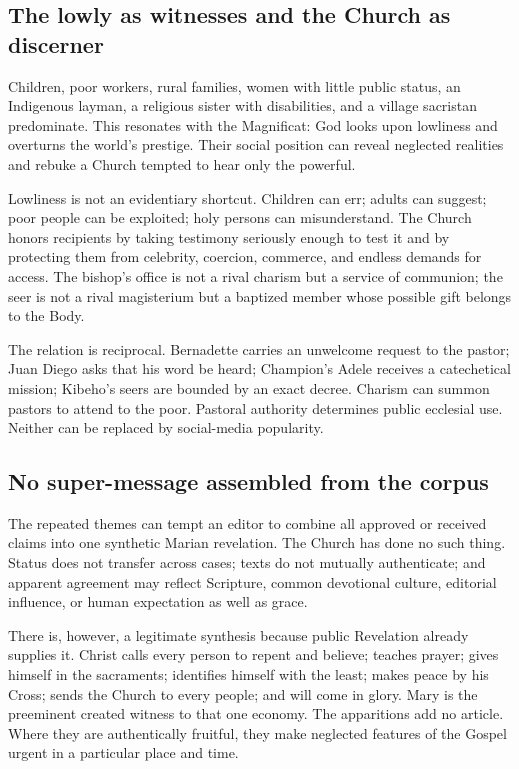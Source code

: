 \subsection{The lowly as witnesses and the Church as discerner}

Children, poor workers, rural families, women with little public status, an Indigenous layman, a religious sister with disabilities, and a village sacristan predominate. This resonates with the Magnificat: God looks upon lowliness and overturns the world's prestige. Their social position can reveal neglected realities and rebuke a Church tempted to hear only the powerful.

Lowliness is not an evidentiary shortcut. Children can err; adults can suggest; poor people can be exploited; holy persons can misunderstand. The Church honors recipients by taking testimony seriously enough to test it and by protecting them from celebrity, coercion, commerce, and endless demands for access. The bishop's office is not a rival charism but a service of communion; the seer is not a rival magisterium but a baptized member whose possible gift belongs to the Body.

The relation is reciprocal. Bernadette carries an unwelcome request to the pastor; Juan Diego asks that his word be heard; Champion's Adele receives a catechetical mission; Kibeho's seers are bounded by an exact decree. Charism can summon pastors to attend to the poor. Pastoral authority determines public ecclesial use. Neither can be replaced by social-media popularity.

\subsection{No super-message assembled from the corpus}

The repeated themes can tempt an editor to combine all approved or received claims into one synthetic Marian revelation. The Church has done no such thing. Status does not transfer across cases; texts do not mutually authenticate; and apparent agreement may reflect Scripture, common devotional culture, editorial influence, or human expectation as well as grace.

There is, however, a legitimate synthesis because public Revelation already supplies it. Christ calls every person to repent and believe; teaches prayer; gives himself in the sacraments; identifies himself with the least; makes peace by his Cross; sends the Church to every people; and will come in glory. Mary is the preeminent created witness to that one economy. The apparitions add no article. Where they are authentically fruitful, they make neglected features of the Gospel urgent in a particular place and time.
